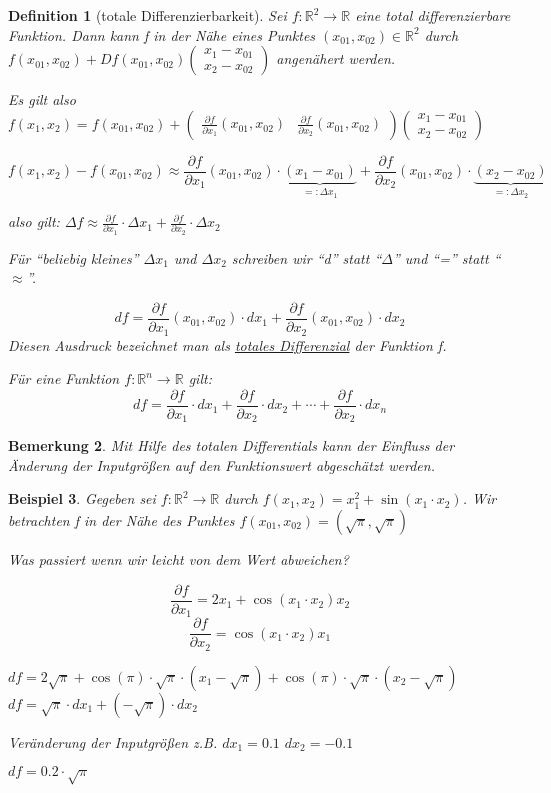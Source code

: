 \documentclass[12pt,a4paper]{scrreprt}
\newtheorem{defi}{Definition}[section]
\newtheorem{bemerkung}[defi]{Bemerkung}
\newtheorem{beispiel}[defi]{Beispiel}
\begin{document}
\begin{defi}[totale Differenzierbarkeit]
Sei $f:\mathbb{R}^2\to\mathbb{R}$ eine total differenzierbare Funktion. Dann kann f in der Nähe eines Punktes $(x_{01},x_{02})\in\mathbb{R}^2$ durch $f(x_{01},x_{02})+Df(x_{01},x_{02})\begin{pmatrix}x_1-x_{01} \\ x_2-x_{02}\end{pmatrix}$ angenähert werden.

	Es gilt also $f(x_1,x_2)=f(x_{01},x_{02})+\begin{pmatrix}
		\frac{\partial f}{\partial x_1}(x_{01},x_{02}) & \frac{\partial f}{\partial x_2}(x_{01},x_{02})\end{pmatrix}\begin{pmatrix}
			x_1-x_{01} \\ x_2-x_{02}
		\end{pmatrix}$

\[f(x_1,x_2)-f(x_{01},x_{02})\approx\frac{\partial f}{\partial x_1}(x_{01},x_{02})\cdot\underbrace{(x_1-x_{01})}_{=:\Delta x_1} + \frac{\partial f}{\partial x_2}(x_{01},x_{02})\cdot\underbrace{(x_2-x_{02})}_{=:\Delta x_2}\]

also gilt: $\Delta f\approx \frac{\partial f}{\partial x_1}\cdot\Delta x_1 + \frac{\partial f}{\partial x_2}\cdot\Delta x_2$

Für \enquote{beliebig kleines} $\Delta x_1$ und $\Delta x_2$ schreiben wir \enquote{d} statt \enquote{$\Delta$} und \enquote{=} statt \enquote{$\approx$}.

\[\boxed{df = \frac{\partial f}{\partial x_1}(x_{01},x_{02})\cdot dx_1 + \frac{\partial f}{\partial x_2}(x_{01},x_{02})\cdot dx_2} \]
Diesen Ausdruck bezeichnet man als \underline{totales Differenzial} der Funktion f.

Für eine Funktion $f:\mathbb{R}^n\to\mathbb{R}$ gilt:
\[\boxed{df = \frac{\partial f}{\partial x_1}\cdot dx_1 + \frac{\partial f}{\partial x_2}\cdot dx_2 + \cdots + \frac{\partial f}{\partial x_2}\cdot dx_n}\]
\end{defi}

\begin{bemerkung}
	Mit Hilfe des totalen Differentials kann der Einfluss der Änderung der Inputgrößen auf den Funktionswert abgeschätzt werden.
\end{bemerkung}

\begin{beispiel}
	Gegeben sei $f:\mathbb{R}^2\to\mathbb{R}$ durch $f(x_1,x_2)=x_1^2+\sin(x_1\cdot x_2)$. Wir betrachten f in der Nähe des Punktes $f(x_{01},x_{02})=(\sqrt{\pi},\sqrt{\pi})$

	Was passiert wenn wir leicht von dem Wert abweichen?

	\[\frac{\partial f}{\partial x_1}=2x_1+\cos(x_1\cdot x_2)x_2\]
	\[\frac{\partial f}{\partial x_2}=\cos(x_1 \cdot x_2)x_1\]

	\(df=2\sqrt{\pi}+\cos(\pi)\cdot\sqrt{\pi}\cdot(x_1-\sqrt{\pi})+\cos(\pi)\cdot\sqrt{\pi}\cdot(x_2-\sqrt{\pi}) \)
	\(df=\sqrt{\pi}\cdot dx_1+(-\sqrt{\pi})\cdot dx_2\)

	Veränderung der Inputgrößen z.B. $dx_1=0.1$ $dx_2=-0.1$

	$df=0.2\cdot\sqrt{\pi}$
\end{beispiel}
\end{document}
